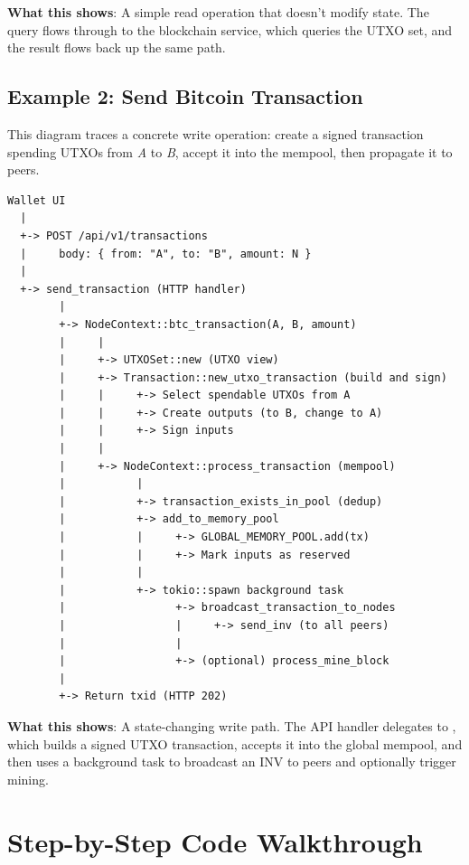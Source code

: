 \textbf{What this shows}: A simple read operation that doesn't modify state. The query flows through  to the blockchain service, which queries the UTXO set, and the result flows back up the same path.

\subsection{Example 2: Send Bitcoin Transaction}
\label{sec:ch09-8-sendtx}

This diagram traces a concrete write operation: create a signed transaction spending UTXOs from \emph{A} to \emph{B}, accept it into the mempool, then propagate it to peers.

\begin{verbatim}
Wallet UI
  |
  +-> POST /api/v1/transactions
  |     body: { from: "A", to: "B", amount: N }
  |
  +-> send_transaction (HTTP handler)
        |
        +-> NodeContext::btc_transaction(A, B, amount)
        |     |
        |     +-> UTXOSet::new (UTXO view)
        |     +-> Transaction::new_utxo_transaction (build and sign)
        |     |     +-> Select spendable UTXOs from A
        |     |     +-> Create outputs (to B, change to A)
        |     |     +-> Sign inputs
        |     |
        |     +-> NodeContext::process_transaction (mempool)
        |           |
        |           +-> transaction_exists_in_pool (dedup)
        |           +-> add_to_memory_pool
        |           |     +-> GLOBAL_MEMORY_POOL.add(tx)
        |           |     +-> Mark inputs as reserved
        |           |
        |           +-> tokio::spawn background task
        |                 +-> broadcast_transaction_to_nodes
        |                 |     +-> send_inv (to all peers)
        |                 |
        |                 +-> (optional) process_mine_block
        |
        +-> Return txid (HTTP 202)
\end{verbatim}

\textbf{What this shows}: A state-changing write path. The API handler delegates to , which builds a signed UTXO transaction, accepts it into the global mempool, and then uses a background task to broadcast an INV to peers and optionally trigger mining.

\section{Step-by-Step Code Walkthrough}
\label{sec:ch09-8-walkthrough}

